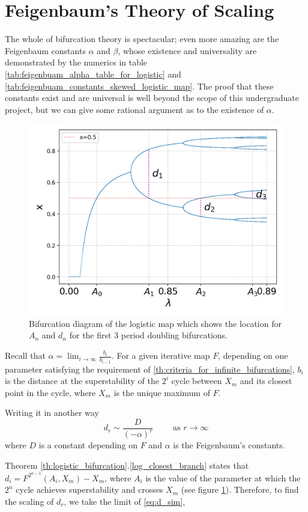 \section{Feigenbaum's Theory of Scaling}

The whole of bifurcation theory is spectacular; even more amazing are the Feigenbaum constants $\alpha$ and $\beta$, whose existence and universality are demonstrated by the numerics in table \ref{tab:feigenbuam_alpha_table_for_logistic} and \ref{tab:feigenbuam_constants_skewed_logistic_map}.
The proof that these constants exist and are universal is well beyond the scope of this undergraduate project, but we can give some rational argument as to the existence of $\alpha$.

\begin{figure}
    \centering
    \includegraphics[width=0.6\linewidth]{Images/demonstration of feigenbaum constants.png}
    \caption{Bifurcation diagram of the logistic map which shows the location for $A_n$ and $d_n$ for the first 3 period doubling bifurcations.}
	\label{fig: universal raito}
\end{figure} 

Recall that $\alpha = \lim_{i \rightarrow  \infty}\frac{b_i}{b_{i-1}}$. 
For a given iterative map $F$, depending on one parameter satisfying the requirement of \ref{th:criteria_for_infinite_bifurcations}, $b_i$ is the distance at the superstability of the $2^{i}$ cycle between $X_{m}$ and its closest point in the cycle, where $X_m$ is the unique maximum of $F$.

Writing it in another way
\begin{equation}\label{eq:d_sim}
d_r \sim\frac{D}{(-\alpha)^r} \quad \quad \text{ as } r \to \infty
\end{equation}
where $D$ is a constant depending on $F$ and $\alpha$ is the Feigenbaum's constants. 

Theorem \ref{th:logistic_bifurcation}.\ref{log_closest_branch} states that $d_i = F^{2^{n-1}}(A_i, X_m) - X_m$, where $A_i$ is the value of the parameter at which the $2^n$ cycle achieves superstability and crosses $X_m$ (see figure \ref{fig: universal raito}). 
Therefore, to find the scaling of $d_r$, we take the limit of \eqref{eq:d_sim},

